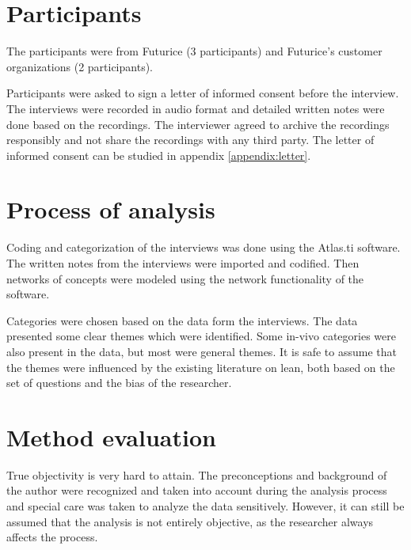 
\section{Participants}
\label{section:methodparticipants}

The participants were from Futurice (3 participants) and Futurice's customer organizations (2 participants).

Participants were asked to sign a letter of informed consent before the interview. The interviews were recorded in audio format and detailed written notes were done based on the recordings. The interviewer agreed to archive the recordings responsibly and not share the recordings with any third party. The letter of informed consent can be studied in appendix \ref{appendix:letter}.


\section{Process of analysis}
\label{section:methodprocess}


Coding and categorization of the interviews was done using the Atlas.ti software. The written notes from the interviews were imported and codified. Then networks of concepts were modeled using the network functionality of the software.

Categories were chosen based on the data form the interviews. The data presented some clear themes which were identified. Some in-vivo categories were also present in the data, but most were general themes. It is safe to assume that the themes were influenced by the existing literature on lean, both based on the set of questions and the bias of the researcher.


\section{Method evaluation}
\label{section:methodevaluation}

True objectivity is very hard to attain. The preconceptions and background of the author were recognized and taken into account during the analysis process and special care was taken to analyze the data sensitively. However, it can still be assumed that the analysis is not entirely objective, as the researcher always affects the process.

